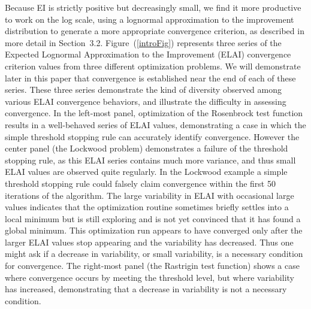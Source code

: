 \documentclass[12pt]{article}
\begin{document}
Because EI is strictly positive but decreasingly small,
we find it more productive to work on the log scale, using a lognormal
approximation to the improvement distribution to generate a more appropriate convergence criterion, as described in more
detail in Section~3.2.
%
Figure~(\ref{introFig}) represents three series of the Expected
Lognormal Approximation to the Improvement (ELAI) convergence criterion values from three
different optimization problems.
%
We will demonstrate later in this paper that convergence is established near the end of each of these series.
These three series demonstrate the kind of diversity observed among various ELAI convergence behaviors, and illustrate the difficulty in assessing convergence.  
%
In the left-most panel, optimization of the Rosenbrock test function 
results in a well-behaved series of ELAI values, demonstrating a case in 
which the simple threshold stopping rule can accurately identify convergence.
However the center panel (the Lockwood problem) demonstrates a failure of 
the threshold stopping rule, as this ELAI series contains much more 
variance, and thus small ELAI values are observed quite regularly.
In the Lockwood example a simple threshold stopping rule could falsely
claim convergence within the first 50 iterations of the algorithm.
%
The large variability in ELAI with occasional large values indicates that 
the optimization routine sometimes briefly settles into a local minimum but is 
still exploring and is not yet convinced that it has found a global minimum.
This optimization run appears to have converged only after the
larger ELAI values stop appearing and the variability has decreased.
%
Thus one might ask if a decrease in variability, or small variability,
is a necessary condition for convergence.  
%
The right-most panel (the Rastrigin test function) 
shows a case where convergence occurs by meeting the threshold level,
but where variability has increased, demonstrating that a decrease in
variability is not a necessary condition.
\end{document}
